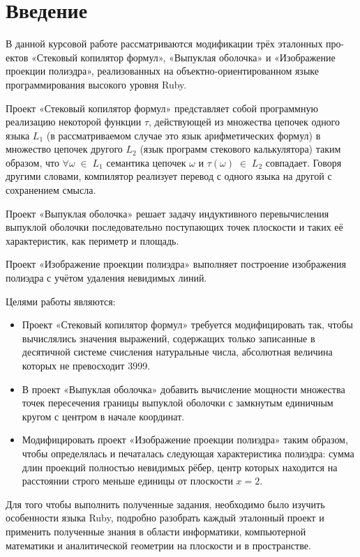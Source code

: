 \section{Введение}
В данной курсовой работе рассматриваются модификации трёх эталонных про-
ектов «Стековый копилятор формул», «Выпуклая оболочка» и 
«Изображение проекции полиэдра», реализованных на объектно-ориентированном 
языке программирования высокого уровня Ruby.

Проект «Стековый копилятор формул»\cite{compf} представляет собой 
программную реализацию некоторой функции $\tau$, действующей из 
множества цепочек одного языка $L_1$ (в рассматриваемом случае 
это язык арифметических формул) в множество цепочек 
другого $L_2$ (язык программ стекового калькулятора) таким образом, 
что $\forall\omega\;\in\;L_1$ семантика 
цепочек $\omega$ и $\tau(\omega)\;\in\;L_2$ совпадает. 
Говоря другими словами, компилятор реализует перевод 
с одного языка на другой с сохранением смысла.

Проект «Выпуклая оболочка»\cite{convex} решает задачу индуктивного 
перевычисления выпуклой оболочки последовательно поступающих точек плоскости 
и таких её характеристик, как периметр и площадь.

Проект «Изображение проекции полиэдра»\cite{polyedr} выполняет построение изображения 
полиэдра с учётом удаления невидимых линий.

Целями работы являются:
\begin{itemize}
\item Проект «Стековый копилятор формул» требуется модифицировать так, 
чтобы вычислялись значения выражений, содержащих только записанные в 
десятичной системе счисления натуральные числа, абсолютная величина 
которых не превосходит 3999.
\item В проект «Выпуклая оболочка» добавить вычисление мощности 
множества точек пересечения границы выпуклой оболочки 
с замкнутым единичным кругом с центром в начале координат.
\item Модифицировать проект «Изображение проекции полиэдра» таким образом, 
чтобы определялась и печаталась следующая характеристика полиэдра: 
сумма длин проекций полностью невидимых рёбер, центр которых находится 
на расстоянии строго меньше единицы от плоскости $x=2$.
\end{itemize}

Для того чтобы выполнить полученные задания, необходимо было изучить 
особенности языка Ruby, подробно разобрать каждый эталонный проект и 
применить полученные знания в области информатики, 
компьютерной математики и аналитической геометрии на плоскости и 
в пространстве.
